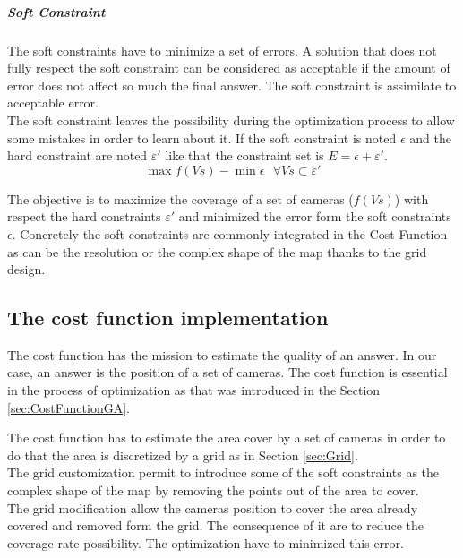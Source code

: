  \subparagraph{Soft Constraint}
 The soft constraints have to minimize a set of errors. 
A solution that does not fully respect the soft constraint can be considered as acceptable if the
 amount of error does not affect so much the final answer. The soft constraint is assimilate to acceptable error. \\
 The soft constraint leaves the possibility during the optimization process to allow some mistakes in order to learn about it.  
 If the soft constraint is noted $\epsilon$ and the hard constraint are noted $ \varepsilon '$ like that the constraint set is $E=\epsilon+\varepsilon'$.\\
 
  \begin{equation}\label{eq:constraintEpsilon}
 	\max f(Vs) - \min \epsilon  \mbox{  } \forall Vs \subset \varepsilon'
 \end{equation}
 
The objective is to maximize the coverage of a set of cameras ($f(Vs)$) with respect the hard constraints $\varepsilon'$ and minimized the error form the soft constraints $\epsilon$.
Concretely the soft constraints are commonly integrated in the Cost Function as can be the resolution or  the  complex shape of the map thanks to the grid design. 


\subsection{The cost function implementation} \label{sec:costFun}

The cost function has the mission to estimate the quality of an answer. In our case, an answer is the position  of a set of cameras. The cost function is essential in the process of optimization as that was introduced in the Section \ref{sec:CostFunctionGA}.

The cost function has to estimate the area cover by a set of cameras in order to do that the area is discretized by a grid as in Section \ref{sec:Grid}. \\
The grid customization permit to introduce some of the soft constraints as the complex shape of the map by removing the points out of the area to cover.  \\
The grid modification  allow the cameras position to cover the area already covered and removed form the grid. The consequence of it are to reduce the coverage rate possibility. The optimization have to minimized this error.

